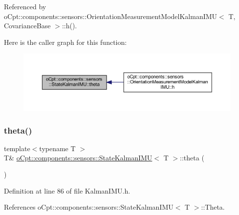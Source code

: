 Referenced by o\+Cpt\+::components\+::sensors\+::\+Orientation\+Measurement\+Model\+Kalman\+I\+M\+U$<$ T, Covariance\+Base $>$\+::h().

Here is the caller graph for this function\+:
\nopagebreak
\begin{figure}[H]
\begin{center}
\leavevmode
\includegraphics[width=350pt]{classo_cpt_1_1components_1_1sensors_1_1_state_kalman_i_m_u_ab12a6b15e2f34e35e02c35df79936011_icgraph}
\end{center}
\end{figure}
\hypertarget{classo_cpt_1_1components_1_1sensors_1_1_state_kalman_i_m_u_a752933a8138ba51f242f628c0d6b73b2}{}\label{classo_cpt_1_1components_1_1sensors_1_1_state_kalman_i_m_u_a752933a8138ba51f242f628c0d6b73b2} 
\subsubsection{\texorpdfstring{theta()}{theta()}\hspace{0.1cm}{\footnotesize\ttfamily [2/2]}}
{\footnotesize\ttfamily template$<$typename T $>$ \\
T\& \hyperlink{classo_cpt_1_1components_1_1sensors_1_1_state_kalman_i_m_u}{o\+Cpt\+::components\+::sensors\+::\+State\+Kalman\+I\+MU}$<$ T $>$\+::theta (\begin{DoxyParamCaption}{ }\end{DoxyParamCaption})\hspace{0.3cm}{\ttfamily [inline]}}



Definition at line 86 of file Kalman\+I\+M\+U.\+h.



References o\+Cpt\+::components\+::sensors\+::\+State\+Kalman\+I\+M\+U$<$ T $>$\+::\+Theta.

\hypertarget{classo_cpt_1_1components_1_1sensors_1_1_state_kalman_i_m_u_a76f4d4c223a3544dc4212caf7ea8abc0}{}\label{classo_cpt_1_1components_1_1sensors_1_1_state_kalman_i_m_u_a76f4d4c223a3544dc4212caf7ea8abc0} 
